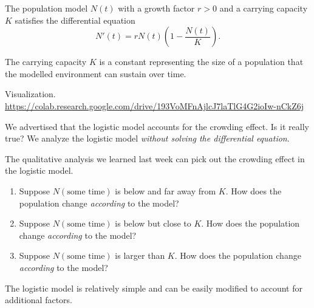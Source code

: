 \documentclass[../main.tex]{subfiles}
\begin{document}
\begin{definition} \label{def:logistic-model}
  The population model \(N(t)\) with a growth factor \(r > 0\) and a carrying capacity \(K\) satisfies the differential equation
  \begin{equation} \label{eq:diff-eq-logistic}
    N'(t) = r N(t) \left( 1 - \frac{N(t)}{K} \right).
  \end{equation}

  The carrying capacity \(K\) is a constant representing the size of a population that the modelled environment can sustain over time.
\end{definition}

Visualization. \faExternalLink*{} \url{https://colab.research.google.com/drive/193VoMFnAjlcJ7laTlG4G2ioIw-nCkZ6j}

We advertised that the logistic model accounts for the crowding effect. Is it really true? We analyze the logistic model \emph{without solving the differential equation}. 

\begin{example} \label{ex:diff-eq-logistic-fact-check}
  The qualitative analysis we learned last week can pick out the crowding effect in the logistic model.

  \begin{enumerate}[wide]
    \item Suppose \(N(\text{some time})\) is below and far away from \(K\). How does the population change \emph{according} to the model?


    \item Suppose \(N(\text{some time})\) is below but close to \(K\). How does the population change \emph{according} to the model?


    \item Suppose \(N(\text{some time})\) is larger than \(K\). How does the population change \emph{according} to the model?

      \blanks*
  \end{enumerate}
\end{example}
\clearpage

The logistic model is relatively simple and can be easily modified to account for additional factors.
\end{document}
